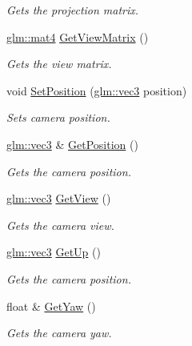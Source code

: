 \begin{CompactItemize}
\begin{CompactList}\small\item\em Gets the projection matrix. \item\end{CompactList}\item 
\hyperlink{group__core__types_g7dcd2365c2e368e6af5b7adeb6a9c8df}{glm::mat4} \hyperlink{class_camera_ffa333055635aed96518c4c66be9a70c}{GetViewMatrix} ()
\begin{CompactList}\small\item\em Gets the view matrix. \item\end{CompactList}\item 
void \hyperlink{class_camera_513c43647fdc22a1f1f2ce75d67e6c43}{SetPosition} (\hyperlink{group__core__types_g1c47e8b3386109bc992b6c48e91b0be7}{glm::vec3} position)
\begin{CompactList}\small\item\em Sets camera position. \item\end{CompactList}\item 
\hyperlink{group__core__types_g1c47e8b3386109bc992b6c48e91b0be7}{glm::vec3} \& \hyperlink{class_camera_0eabfe3e807623f2ff69b121e65d8b8e}{GetPosition} ()
\begin{CompactList}\small\item\em Gets the camera position. \item\end{CompactList}\item 
\hyperlink{group__core__types_g1c47e8b3386109bc992b6c48e91b0be7}{glm::vec3} \hyperlink{class_camera_338c5baf20b57652828c53e0791adf9a}{GetView} ()
\begin{CompactList}\small\item\em Gets the camera view. \item\end{CompactList}\item 
\hyperlink{group__core__types_g1c47e8b3386109bc992b6c48e91b0be7}{glm::vec3} \hyperlink{class_camera_ff61f06284cca3216accdf556dfbd3c1}{GetUp} ()
\begin{CompactList}\small\item\em Gets the camera position. \item\end{CompactList}\item 
float \& \hyperlink{class_camera_614e2fb59605eaff3d57be570805a1c2}{GetYaw} ()
\begin{CompactList}\small\item\em Gets the camera yaw. \item\end{CompactList}\item 

\end{CompactItemize}
